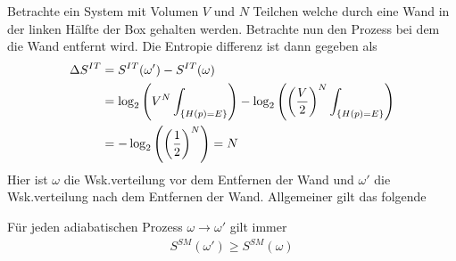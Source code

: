 Betrachte ein System mit Volumen $V$ und $N$ Teilchen welche durch eine Wand
in der linken Hälfte der Box gehalten werden. Betrachte nun den Prozess bei
dem die Wand entfernt wird. Die Entropie differenz ist dann gegeben als
\begin{align*}
    \Delta S^{IT} &= S^{IT}(\omega') - S^{IT}(\omega)
    \\
    &= \log_2 \left( V^N \int_{\left\{ H(p) = E \right\}} \right)
        - \log_2 \left( \left( \frac{V}{2} \right)^N \int_{\left\{ H(p) = E \right\}} \right)
    \\
    &= - \log_2 \left( \left( \frac{1}{2} \right)^N \right) = N 
\end{align*}
Hier ist $\omega$ die Wsk.verteilung vor dem Entfernen der Wand und $\omega'$
die Wsk.verteilung nach dem Entfernen der Wand. Allgemeiner gilt das folgende

\begin{theorem}
    Für jeden adiabatischen Prozess $\omega \rightarrow \omega'$ gilt immer
    \begin{align*}
        S^{SM} (\omega') \geq S^{SM} (\omega)
    \end{align*}
\end{theorem}

